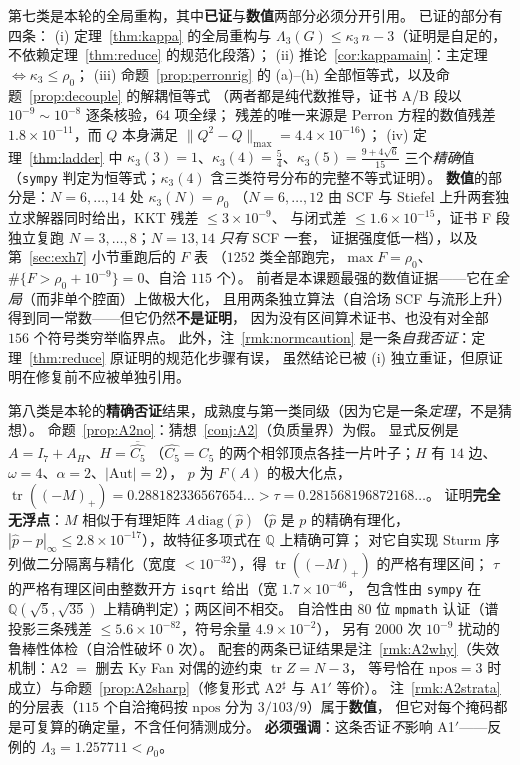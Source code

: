 \documentclass[UTF8,11pt]{ctexart}
\theoremstyle{definition}
\newcommand{\Lam}{\Lambda}
\newcommand{\tr}{\operatorname{tr}}
\newcommand{\Q}{\mathbb{Q}}
\begin{document}
第七类是本轮的全局重构，其中\textbf{已证}与\textbf{数值}两部分必须分开引用。
已证的部分有四条：
(i) 定理~\ref{thm:kappa} 的全局重构与 $\Lam_3(G)\le\kappa_3\,n-3$（证明是自足的，不依赖定理~\ref{thm:reduce} 的规范化段落）；
(ii) 推论~\ref{cor:kappamain}：主定理 $\iff\kappa_3\le\rho_0$；
(iii) 命题~\ref{prop:perronrig} 的 (a)--(h) 全部恒等式，以及命题~\ref{prop:decouple} 的解耦恒等式
（两者都是纯代数推导，证书 A/B 段以 $10^{-9}\sim10^{-8}$ 逐条核验，$64$ 项全绿；
残差的唯一来源是 Perron 方程的数值残差 $1.8\times10^{-11}$，而 $Q$ 本身满足 $\|Q^2-Q\|_{\max}=4.4\times10^{-16}$）；
(iv) 定理~\ref{thm:ladder} 中 $\kappa_3(3)=1$、$\kappa_3(4)=\frac54$、$\kappa_3(5)=\frac{9+4\sqrt6}{15}$
三个\emph{精确}值（\texttt{sympy} 判定为恒等式；$\kappa_3(4)$ 含三类符号分布的完整不等式证明）。
\textbf{数值}的部分是：$N=6,\dots,14$ 处 $\kappa_3(N)=\rho_0$
（$N=6,\dots,12$ 由 SCF 与 Stiefel 上升两套独立求解器同时给出，KKT 残差 $\le3\times10^{-9}$、
与闭式差 $\le1.6\times10^{-15}$，证书 F 段独立复跑 $N=3,\dots,8$；$N=13,14$ \emph{只有} SCF 一套，
证据强度低一档），以及第~\ref{sec:exh7} 小节重跑后的 $F$ 表
（$1252$ 类全部跑完，$\max F=\rho_0$、$\#\{F>\rho_0+10^{-9}\}=0$、自洽 $115$ 个）。
前者是本课题最强的数值证据——它在\emph{全局}（而非单个腔面）上做极大化，
且用两条独立算法（自洽场 SCF 与流形上升）得到同一常数——但它仍然\textbf{不是证明}，
因为没有区间算术证书、也没有对全部 $156$ 个符号类穷举临界点。
此外，注~\ref{rmk:normcaution} 是一条\emph{自我否证}：定理~\ref{thm:reduce} 原证明的规范化步骤有误，
虽然结论已被 (i) 独立重证，但原证明在修复前不应被单独引用。

第八类是本轮的\textbf{精确否证}结果，成熟度与第一类同级（因为它是一条\emph{定理}，不是猜想）。
命题~\ref{prop:A2no}：猜想~\ref{conj:A2}（负质量界）为假。
显式反例是 $A=I_7+A_H$、$H=\overline{\widehat{C_5}}$
（$\widehat{C_5}=C_5$ 的两个相邻顶点各挂一片叶子；$H$ 有 $14$ 边、$\omega=4$、$\alpha=2$、$|\mathrm{Aut}|=2$），
$p$ 为 $F(A)$ 的极大化点，$\tr((-M)_+)=0.288182336567654\ldots>\tau=0.281568196872168\ldots$。
证明\textbf{完全无浮点}：$M$ 相似于有理矩阵 $A\,\mathrm{diag}(\hat p)$（$\hat p$ 是 $p$ 的精确有理化，
$|\hat p-p|_\infty\le2.8\times10^{-17}$），故特征多项式在 $\Q$ 上精确可算；
对它自实现 Sturm 序列做二分隔离与精化（宽度 $<10^{-32}$），得 $\tr((-M)_+)$ 的严格有理区间；
$\tau$ 的严格有理区间由整数开方 \texttt{isqrt} 给出（宽 $1.7\times10^{-46}$，
包含性由 \texttt{sympy} 在 $\Q(\sqrt5,\sqrt{35})$ 上精确判定）；两区间不相交。
自洽性由 $80$ 位 \texttt{mpmath} 认证（谱投影三条残差 $\le5.6\times10^{-82}$，符号余量 $4.9\times10^{-2}$），
另有 $2000$ 次 $10^{-9}$ 扰动的鲁棒性体检（自洽性破坏 $0$ 次）。
配套的两条已证结果是注~\ref{rmk:A2why}（失效机制：A2 $=$ 删去 Ky Fan 对偶的迹约束 $\tr Z=N-3$，
等号恰在 $\mathrm{npos}=3$ 时成立）与命题~\ref{prop:A2sharp}（修复形式 A2$^\sharp$ 与 A1$'$ 等价）。
注~\ref{rmk:A2strata} 的分层表（$115$ 个自洽掩码按 $\mathrm{npos}$ 分为 $3/103/9$）属于\textbf{数值}，
但它对每个掩码都是可复算的确定量，不含任何猜测成分。
\textbf{必须强调}：这条否证\emph{不}影响 A1$'$——反例的 $\Lam_3=1.257711<\rho_0$。
\end{document}
